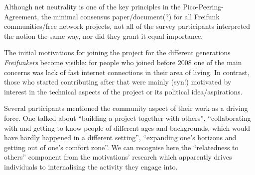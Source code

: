 \begin{comment}
---

### Mir ist Netzneutralität wichtig

* 6 ja
* 1 ja (sesibilität dafür im Freifunk kontext ist nicht unbedingt gegeben)
* 4 ja (aber sieht FF nicht als Kampf für Netzneutralität)
* 1 ja (aber die um jeden preis zu fordern ist schwierig und nicht sehr schlau)
* 1 ja (Pico-Peering-Agreement ist total wichtig!)
* 1 ja (man kanns zumindest versuchen :))

---

### Ich mach das mit Freifunk beruflich: krieg Geld für Knoten einrichten, Wartung, ...

* 9 nein
* 1 joa, kann man als Beruf sehen^^ steckt ziemlich viel Zeit und Energie rein und hat schonmal im Kontext Geld für die eigene Arbeit bekommen
* 1 macht jetzt was mit WiFi und Mesh beruflich (nicht mit Freifunk); eher Konsequenz aus Freifunk als Motivation dafür
* 1 macht beruflich was mit wlan installationen, versuchts aber von ff zu trennen

---

### Ich mach/will machen was auf dem Gebiet beruflich und das ist die Gelegenheit, meine Fähigkeiten aufzupollieren/Kontakte knüpfen/für Arbeitgeber_innen sichtbar werden

* 2 nein (eher: war der Bereich, wo ich meine bereits vorhandenen Kenntnisse anwenden konnte)
* 6 nein
* 1 nein (aber wenn was mit netzwerk machen wollen würde, würde die ff community schon als Kommunikations-/Kontaktplattform sehen)
* 3 nein (passiert sicher, ist aber keine motivation sich mit dem Projekt zu beschäftigen)
* 2 nein (schreibt man schon in den Lebenslauf aber keine Motivation um dahinzugehen)
\end{comment}

Although net neutrality is one of the key principles in the Pico-Peering-Agreement, the minimal consensus paper/document(?) for all Freifunk communities/free network projects, not all of the survey participants interpreted the notion the same way, nor did they grant it equal importance.

The initial motivations for joining the project for the different generations \textit{Freifunkers} become visible:
for people who joined before 2008 one of the main concerns was lack of fast internet connections in their area of living.
In contrast, those who started contributing after that were mainly (syn!) motivated by interest in the technical aspects of the project or its political idea/aspirations.

Several participants mentioned the community aspect of their work as a driving force.
One talked about ``building a project together with others'', ``collaborating with and getting to know people of different ages and backgrounds, which would have hardly happened in a different setting'', ``expanding one's horizons and getting out of one's comfort zone''.
We can recognise here the ``relatedness to others'' component from the motivations' research which apparently drives individuals to internalising the activity they engage into.

